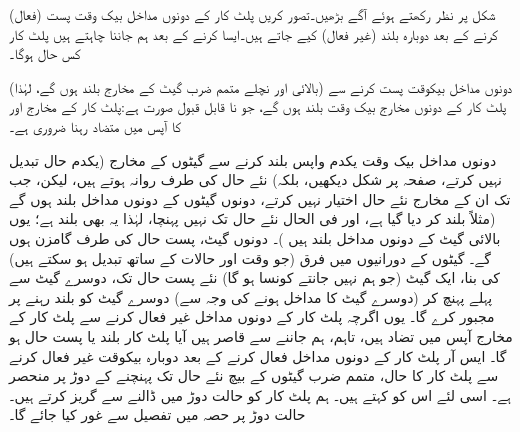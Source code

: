شکل  پر نظر رکھتے ہوئے آگے بڑھیں۔تصور کریں پلٹ کار کے دونوں مداخل بیک وقت پست (فعال) کرنے کے بعد دوبارہ بلند (غیر فعال) کیے جاتے ہیں۔ایسا کرنے کے بعد ہم جاننا چاہتے ہیں پلٹ کار کس حال ہوگا۔

دونوں مداخل بیکوقت پست کرنے سے (بالائی اور نچلے متمم ضرب گیٹ کے مخارج بلند ہوں گے، لہٰذا) پلٹ کار کے دونوں مخارج بیک وقت بلند ہوں گے، جو نا قابل قبول صورت ہے:پلٹ کار کے مخارج  اور  کا آپس میں متضاد رہنا ضروری ہے۔

 دونوں مداخل بیک وقت یکدم واپس بلند کرنے سے گیٹوں کے مخارج (یکدم حال تبدیل نہیں کرتے، صفحہ  پر شکل  دیکھیں، بلکہ) نئے حال کی طرف روانہ ہوتے ہیں، لیکن، جب تک ان کے مخارج نئے حال اختیار نہیں کرتے، دونوں گیٹوں کے دونوں مداخل بلند ہوں گے (مثلاً  بلند کر دیا گیا ہے، اور فی الحال  نئے حال تک نہیں پہنچا، لہٰذا یہ بھی بلند ہے؛ یوں بالائی گیٹ کے دونوں مداخل بلند ہیں )۔ دونوں گیٹ، پست حال کی طرف گامزن ہوں گے۔ گیٹوں کے دورانیوں میں فرق (جو وقت اور حالات کے ساتھ تبدیل ہو سکتے ہیں) کی بنا، ایک گیٹ (جو ہم نہیں جانتے کونسا ہو گا) نئے پست حال تک، دوسرے گیٹ سے پہلے پہنچ کر (دوسرے گیٹ کا مداخل ہونے کی وجہ سے) دوسرے گیٹ کو بلند رہنے پر مجبور کرے گا۔ یوں اگرچہ پلٹ کار کے دونوں مداخل غیر فعال کرنے سے پلٹ کار کے مخارج آپس میں تضاد ہیں، تاہم، ہم جاننے سے قاصر ہیں آیا پلٹ کار بلند یا پست حال ہو گا۔ ایس آر پلٹ کار کے دونوں مداخل فعال کرنے کے بعد دوبارہ بیکوقت غیر فعال کرنے سے پلٹ کار کا حال، متمم ضرب گیٹوں کے بیچ نئے حال تک پہنچنے کے دوڑ پر منحصر ہے۔ اسی لئے اس کو  کہتے ہیں۔ ہم پلٹ کار کو حالت دوڑ میں ڈالنے سے گریز کرتے ہیں۔ حالت دوڑ پر حصہ  میں تفصیل سے غور کیا جائے گا۔
 

